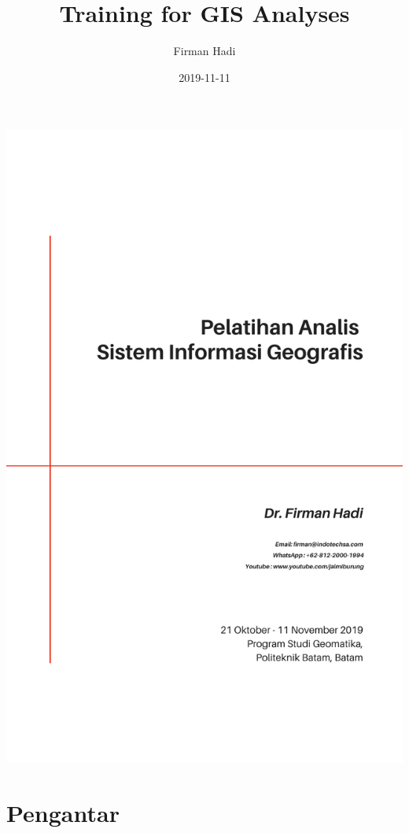 \documentclass[]{book}
\title{Training for GIS Analyses}
\author{Firman Hadi}
\date{2019-11-11}
\begin{document}
\maketitle

\begin{center}
\includegraphics{cover.png}
\end{center}

{
\setcounter{tocdepth}{1}
\tableofcontents
}
\hypertarget{pengantar}{%
\chapter*{Pengantar}\label{pengantar}}
\end{document}

